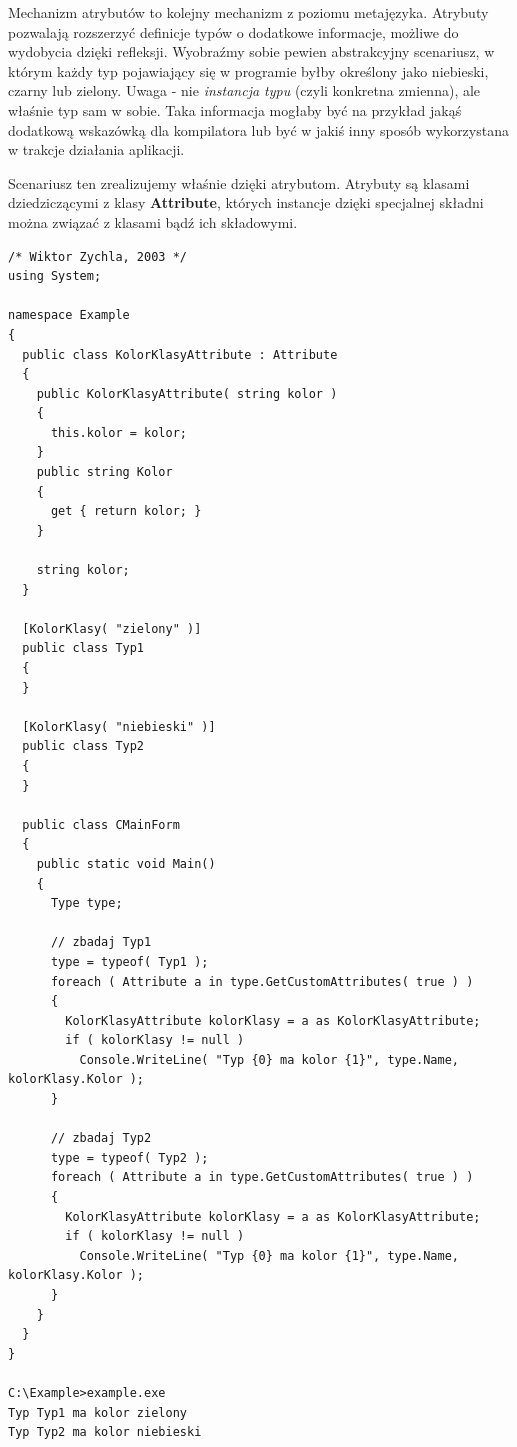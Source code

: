 Mechanizm atrybutów to kolejny mechanizm z poziomu metajęzyka. Atrybuty pozwalają rozszerzyć 
definicje typów o dodatkowe informacje, możliwe do wydobycia dzięki refleksji. Wyobraźmy sobie pewien 
abstrakcyjny scenariusz, w którym każdy typ pojawiający się w programie byłby określony 
jako niebieski, czarny lub zielony. 
Uwaga - nie {\em instancja typu} (czyli konkretna zmienna), ale właśnie typ sam
w sobie. Taka informacja mogłaby być na przykład jakąś dodatkową wskazówką dla kompilatora lub być w jakiś
inny sposób wykorzystana w trakcje działania aplikacji. 

Scenariusz ten zrealizujemy właśnie dzięki atrybutom. Atrybuty są klasami dziedziczącymi z klasy
{\bf Attribute}, których instancje dzięki specjalnej składni można związać z klasami bądź ich składowymi.

\begin{scriptsize}
\begin{verbatim}
/* Wiktor Zychla, 2003 */
using System;

namespace Example
{
  public class KolorKlasyAttribute : Attribute
  {
    public KolorKlasyAttribute( string kolor )
    {
      this.kolor = kolor;
    }
    public string Kolor
    {
      get { return kolor; }
    }

    string kolor;
  }

  [KolorKlasy( "zielony" )]
  public class Typ1
  {
  }

  [KolorKlasy( "niebieski" )]
  public class Typ2
  {
  }

  public class CMainForm 
  {   
    public static void Main()
    {
      Type type;

      // zbadaj Typ1
      type = typeof( Typ1 );
      foreach ( Attribute a in type.GetCustomAttributes( true ) )
      {
        KolorKlasyAttribute kolorKlasy = a as KolorKlasyAttribute;
        if ( kolorKlasy != null )
          Console.WriteLine( "Typ {0} ma kolor {1}", type.Name, kolorKlasy.Kolor ); 
      }       

      // zbadaj Typ2
      type = typeof( Typ2 );
      foreach ( Attribute a in type.GetCustomAttributes( true ) )
      {
        KolorKlasyAttribute kolorKlasy = a as KolorKlasyAttribute;
        if ( kolorKlasy != null )
          Console.WriteLine( "Typ {0} ma kolor {1}", type.Name, kolorKlasy.Kolor ); 
      }       
    }
  }
}

C:\Example>example.exe
Typ Typ1 ma kolor zielony
Typ Typ2 ma kolor niebieski
\end{verbatim}
\end{scriptsize}

